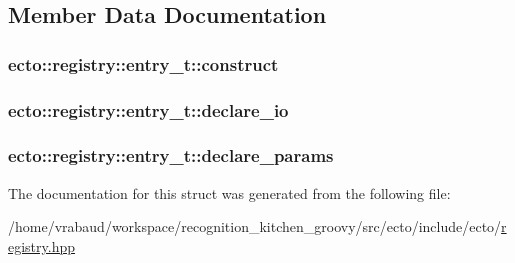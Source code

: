 \subsection{\-Member \-Data \-Documentation}
\hypertarget{structecto_1_1registry_1_1entry__t_ae1c1832273dbd622b1789a82f0832aa8}{
\subsubsection[{construct}]{ {\bf ecto\-::registry\-::entry\-\_\-t\-::construct}}}\label{structecto_1_1registry_1_1entry__t_ae1c1832273dbd622b1789a82f0832aa8}
\hypertarget{structecto_1_1registry_1_1entry__t_ac052cec6adea69584fbb17f24e147ec2}{
\subsubsection[{declare\-\_\-io}]{ {\bf ecto\-::registry\-::entry\-\_\-t\-::declare\-\_\-io}}}\label{structecto_1_1registry_1_1entry__t_ac052cec6adea69584fbb17f24e147ec2}
\hypertarget{structecto_1_1registry_1_1entry__t_a0e87799ee057b4509d45eab85def3b80}{
\subsubsection[{declare\-\_\-params}]{ {\bf ecto\-::registry\-::entry\-\_\-t\-::declare\-\_\-params}}}\label{structecto_1_1registry_1_1entry__t_a0e87799ee057b4509d45eab85def3b80}


\-The documentation for this struct was generated from the following file\-:\begin{DoxyCompactItemize}
\item 
/home/vrabaud/workspace/recognition\-\_\-kitchen\-\_\-groovy/src/ecto/include/ecto/\hyperlink{registry_8hpp}{registry.\-hpp}\end{DoxyCompactItemize}
